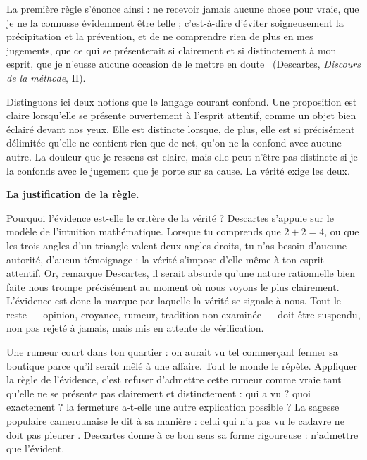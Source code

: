 \documentclass[11pt]{article}
\newcommand{\cle}[1]{{\popxbold\color{popdark}#1}}
\begin{document}
La première règle s'énonce ainsi : \guillemotleft ne recevoir jamais aucune chose pour vraie, que je ne la connusse évidemment être telle ; c'est-à-dire d'éviter soigneusement la précipitation et la prévention, et de ne comprendre rien de plus en mes jugements, que ce qui se présenterait si clairement et si distinctement à mon esprit, que je n'eusse aucune occasion de le mettre en doute \guillemotright\ (Descartes, \emph{Discours de la méthode}, II).

Distinguons ici deux notions que le langage courant confond. Une proposition est \cle{claire} lorsqu'elle se présente ouvertement à l'esprit attentif, comme un objet bien éclairé devant nos yeux. Elle est \cle{distincte} lorsque, de plus, elle est si précisément délimitée qu'elle ne contient rien que de net, qu'on ne la confond avec aucune autre. La douleur que je ressens est claire, mais elle peut n'être pas distincte si je la confonds avec le jugement que je porte sur sa cause. La vérité exige les deux.

\textbf{La justification de la règle.}\par
Pourquoi l'évidence est-elle le critère de la vérité ? Descartes s'appuie sur le modèle de l'\cle{intuition mathématique}. Lorsque tu comprends que $2 + 2 = 4$, ou que les trois angles d'un triangle valent deux angles droits, tu n'as besoin d'aucune autorité, d'aucun témoignage : la vérité s'impose d'elle-même à ton esprit attentif. Or, remarque Descartes, il serait absurde qu'une nature rationnelle bien faite nous trompe précisément au moment où nous voyons le plus clairement. L'évidence est donc la marque par laquelle la vérité se signale à nous. Tout le reste — opinion, croyance, rumeur, tradition non examinée — doit être suspendu, non pas rejeté à jamais, mais mis en attente de vérification.

\begin{exemplebox}
Une rumeur court dans ton quartier : on aurait vu tel commerçant fermer sa boutique parce qu'il serait mêlé à une affaire. Tout le monde le répète. Appliquer la règle de l'évidence, c'est refuser d'admettre cette rumeur comme vraie tant qu'elle ne se présente pas clairement et distinctement : qui a vu ? quoi exactement ? la fermeture a-t-elle une autre explication possible ? La sagesse populaire camerounaise le dit à sa manière : \guillemotleft celui qui n'a pas vu le cadavre ne doit pas pleurer \guillemotright. Descartes donne à ce bon sens sa forme rigoureuse : n'admettre que l'évident.
\end{exemplebox}
\end{document}
